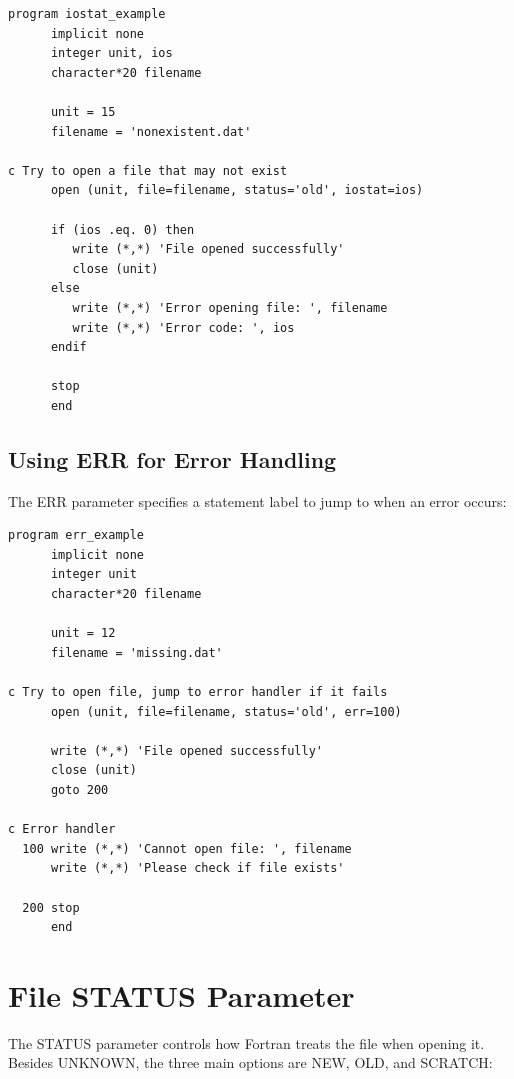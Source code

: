 \begin{lstlisting}[style=fortran77]
      program iostat_example
      implicit none
      integer unit, ios
      character*20 filename
      
      unit = 15
      filename = 'nonexistent.dat'
      
c Try to open a file that may not exist
      open (unit, file=filename, status='old', iostat=ios)
      
      if (ios .eq. 0) then
         write (*,*) 'File opened successfully'
         close (unit)
      else
         write (*,*) 'Error opening file: ', filename
         write (*,*) 'Error code: ', ios
      endif
      
      stop
      end
\end{lstlisting}

\subsection{Using ERR for Error Handling}

The ERR parameter specifies a statement label to jump to when an error occurs:

\begin{lstlisting}[style=fortran77]
      program err_example
      implicit none
      integer unit
      character*20 filename
      
      unit = 12
      filename = 'missing.dat'
      
c Try to open file, jump to error handler if it fails
      open (unit, file=filename, status='old', err=100)
      
      write (*,*) 'File opened successfully'
      close (unit)
      goto 200
      
c Error handler
  100 write (*,*) 'Cannot open file: ', filename
      write (*,*) 'Please check if file exists'
      
  200 stop
      end
\end{lstlisting}

\section{File STATUS Parameter}

The STATUS parameter controls how Fortran treats the file when opening it. Besides UNKNOWN, the three main options are NEW, OLD, and SCRATCH:

